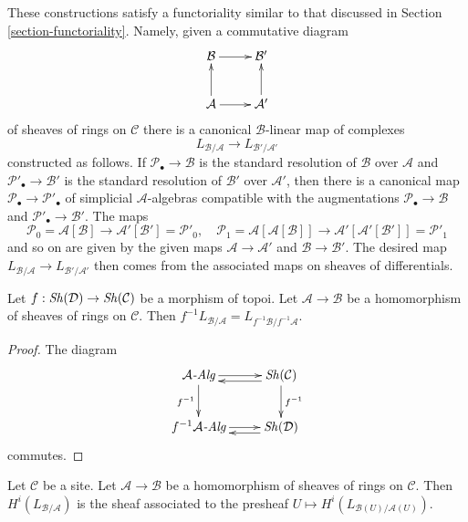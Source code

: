 \noindent
These constructions satisfy a functoriality similar to that discussed
in Section \ref{section-functoriality}. Namely, given a commutative diagram
\begin{equation}
\label{equation-commutative-square-sheaves}
\vcenter{
\xymatrix{
\mathcal{B} \ar[r] & \mathcal{B}' \\
\mathcal{A} \ar[u] \ar[r] & \mathcal{A}' \ar[u]
}
}
\end{equation}
of sheaves of rings on $\mathcal{C}$ there is a canonical
$\mathcal{B}$-linear map of complexes
$$
L_{\mathcal{B}/\mathcal{A}} \longrightarrow L_{\mathcal{B}'/\mathcal{A}'}
$$
constructed as follows. If $\mathcal{P}_\bullet \to \mathcal{B}$ is the
standard resolution of $\mathcal{B}$ over $\mathcal{A}$ and
$\mathcal{P}'_\bullet \to \mathcal{B}'$ is the
standard resolution of $\mathcal{B}'$ over $\mathcal{A}'$,
then there is a canonical map $\mathcal{P}_\bullet \to \mathcal{P}'_\bullet$
of simplicial $\mathcal{A}$-algebras compatible with the augmentations
$\mathcal{P}_\bullet \to \mathcal{B}$ and
$\mathcal{P}'_\bullet \to \mathcal{B}'$. The maps
$$
\mathcal{P}_0 = \mathcal{A}[\mathcal{B}]
\longrightarrow
\mathcal{A}'[\mathcal{B}'] = \mathcal{P}'_0,
\quad
\mathcal{P}_1 = \mathcal{A}[\mathcal{A}[\mathcal{B}]]
\longrightarrow
\mathcal{A}'[\mathcal{A}'[\mathcal{B}']] = \mathcal{P}'_1
$$
and so on are given by the given maps $\mathcal{A} \to \mathcal{A}'$
and $\mathcal{B} \to \mathcal{B}'$. The desired map
$L_{\mathcal{B}/\mathcal{A}} \to L_{\mathcal{B}'/\mathcal{A}'}$
then comes from the associated maps on sheaves of differentials.

\begin{lemma}
\label{lemma-pullback-cotangent-morphism-topoi}
Let $f : \mathop{\mathit{Sh}}\nolimits(\mathcal{D}) \to \mathop{\mathit{Sh}}\nolimits(\mathcal{C})$ be a morphism of topoi.
Let $\mathcal{A} \to \mathcal{B}$ be a homomorphism of sheaves of rings
on $\mathcal{C}$. Then
$f^{-1}L_{\mathcal{B}/\mathcal{A}} = L_{f^{-1}\mathcal{B}/f^{-1}\mathcal{A}}$.
\end{lemma}

\begin{proof}
The diagram
$$
\xymatrix{
\mathcal{A}\textit{-Alg} \ar[d]_{f^{-1}} \ar[r] &
\Sh(\mathcal{C}) \ar@<1ex>[l] \ar[d]^{f^{-1}} \\
f^{-1}\mathcal{A}\textit{-Alg} \ar[r] & \Sh(\mathcal{D}) \ar@<1ex>[l]
}
$$
commutes.
\end{proof}

\begin{lemma}
\label{lemma-compute-L-morphism-sheaves-rings}
Let $\mathcal{C}$ be a site. Let $\mathcal{A} \to \mathcal{B}$ be a
homomorphism of sheaves of rings on $\mathcal{C}$. Then
$H^i(L_{\mathcal{B}/\mathcal{A}})$ is the sheaf associated to the
presheaf $U \mapsto H^i(L_{\mathcal{B}(U)/\mathcal{A}(U)})$.
\end{lemma}

